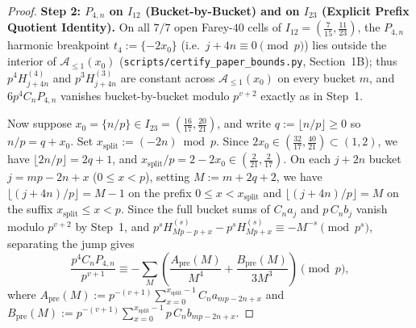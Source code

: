 \documentclass[11pt,reqno]{amsart}
\theoremstyle{definition}
\theoremstyle{remark}
\begin{document}
\begin{proof}
\medskip
\noindent\textbf{Step 2: $P_{4,n}$ on $I_{12}$ (Bucket-by-Bucket) and on $I_{23}$ (Explicit Prefix Quotient Identity).}
On all $7/7$ open Farey-$40$ cells of $I_{12} = (\frac{7}{15}, \frac{11}{23})$, the $P_{4,n}$ harmonic breakpoint $t_4 := \{-2x_0\}$ (i.e.\ $j + 4n \equiv 0 \pmod p$) lies outside the interior of $\mathcal{A}_{\le 1}(x_0)$ (\texttt{scripts/certify\_paper\_bounds.py}, Section~1B); thus $p^4 H_{j+4n}^{(4)}$ and $p^3 H_{j+4n}^{(3)}$ are constant across $\mathcal{A}_{\le 1}(x_0)$ on every bucket $m$, and $6 p^4 C_n P_{4,n}$ vanishes bucket-by-bucket modulo $p^{v+2}$ exactly as in Step~1.

Now suppose $x_0 = \{n/p\} \in I_{23} = (\frac{16}{17}, \frac{20}{21})$, and write $q := \lfloor n/p \rfloor \ge 0$ so $n/p = q + x_0$. Set $x_{\mathrm{split}} := (-2n) \bmod p$. Since $2x_0 \in (\frac{32}{17}, \frac{40}{21}) \subset (1, 2)$, we have $\lfloor 2n/p \rfloor = 2q + 1$, and $x_{\mathrm{split}}/p = 2 - 2x_0 \in (\frac{2}{21}, \frac{2}{17})$. On each $j + 2n$ bucket $j = mp - 2n + x$ ($0 \le x < p$), setting $M := m + 2q + 2$, we have $\lfloor (j + 4n)/p \rfloor = M - 1$ on the prefix $0 \le x < x_{\mathrm{split}}$ and $\lfloor (j + 4n)/p \rfloor = M$ on the suffix $x_{\mathrm{split}} \le x < p$. Since the full bucket sums of $C_n a_j$ and $p\,C_n b_j$ vanish modulo $p^{v+2}$ by Step~1, and $p^s H_{Mp - p + x}^{(s)} - p^s H_{Mp + x}^{(s)} \equiv -M^{-s} \pmod{p^s}$, separating the jump gives
\begin{equation}
\label{eq:p4-I23-split}
  \frac{p^4 C_n P_{4,n}}{p^{v+1}}
  \equiv -\sum_{M} \left(\frac{A_{\mathrm{pre}}(M)}{M^4} + \frac{B_{\mathrm{pre}}(M)}{3 M^3}\right) \pmod p,
\end{equation}
where $A_{\mathrm{pre}}(M) := p^{-(v+1)}\sum_{x=0}^{x_{\mathrm{split}}-1} C_n a_{mp-2n+x}$ and $B_{\mathrm{pre}}(M) := p^{-(v+1)}\sum_{x=0}^{x_{\mathrm{split}}-1} p\,C_n b_{mp-2n+x}$.


\end{proof}
\end{document}
